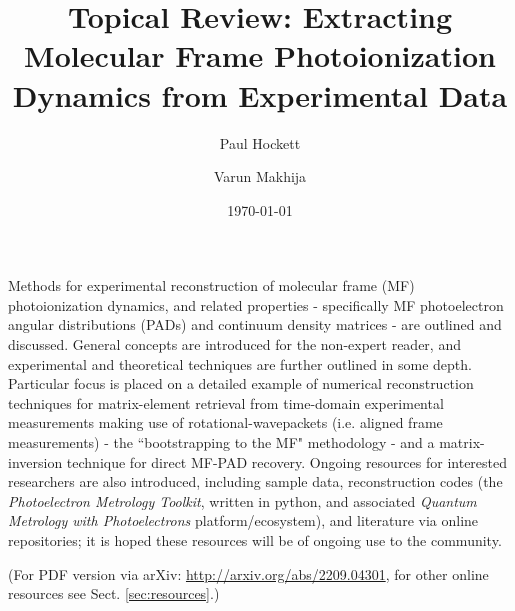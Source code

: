 \documentclass[10pt]{article}
\renewenvironment{abstract}
  {{\bfseries\noindent{\abstractname}\par\nobreak}\footnotesize}
  {\bigskip}
\begin{document}
\title{Topical Review: Extracting Molecular Frame Photoionization Dynamics from
Experimental Data}



\author[1]{Paul Hockett}%
\author[2]{Varun Makhija}%
%
%


\vspace{-1em}



  \date{\today}


\begingroup
\let\center\flushleft
\let\endcenter\endflushleft
\maketitle
\endgroup





\begin{abstract}
Methods for experimental reconstruction of molecular frame (MF)
photoionization dynamics, and related properties - specifically MF
photoelectron angular distributions (PADs) and continuum density
matrices - are outlined and discussed. General concepts are introduced
for the non-expert reader, and experimental and theoretical techniques
are further outlined in some depth. Particular focus is placed on a
detailed example of numerical reconstruction techniques for
matrix-element retrieval from time-domain experimental measurements
making use of rotational-wavepackets (i.e. aligned frame measurements) -
the ``bootstrapping to the MF" methodology - and a matrix-inversion
technique for direct MF-PAD recovery. Ongoing resources for interested
researchers are also introduced, including sample data, reconstruction
codes (the \emph{Photoelectron Metrology Toolkit}, written in python,
and associated \emph{Quantum Metrology with Photoelectrons}
platform/ecosystem), and literature via online repositories; it is hoped
these resources will be of ongoing use to the community.%
\end{abstract}%



\sloppy


(For PDF version via arXiv: \href{http://arxiv.org/abs/2209.04301}{http://arxiv.org/abs/2209.04301}, for other online resources see Sect. \ref{sec:resources}.)


\end{document}
